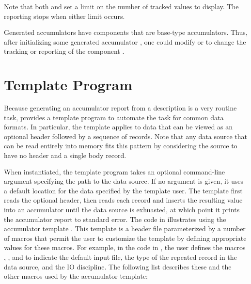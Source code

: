 Note that both  and  set a limit on
the number of tracked values to display.  The reporting stops when
either limit occurs.

Generated accumulators have components that are base-type
accumulators.  Thus, after initializing some generated accumulator
, one could modify  or
 to change the tracking or reporting of the
 component .

\section{Template Program}
Because generating an accumulator report from a \pads{} description is
a very routine task, \pads{} provides a template program to automate
the task for common data formats.  In particular, the template applies
to data that can be viewed as an optional header followed by a
sequence of records.  Note that any data source that can be read
entirely into memory fits this pattern by considering the source to
have no header and a single body record.

When instantiated, the template program takes an optional command-line
argument specifying the path to the data source. If no argument is
given, it uses a default location for the data specified by the
template user.
The template first reads the optional header, then
reads each record and inserts the resulting value into an
accumulator until the data source is exhuasted, at which point it
prints the accumulator report to standard error.
The code in 
illustrates using the accumulator template
. This template is a \C{} header file
parameterized by a number of macros that permit the user to customize
the template by defining appropriate values for these macros.  For
example, in the code in , the user defines the
macros , , and  to
indicate the default input file, the type of the repeated record in
the data source, and the IO discipline.
The following list describes these and the other macros used by the
accumulator template:

